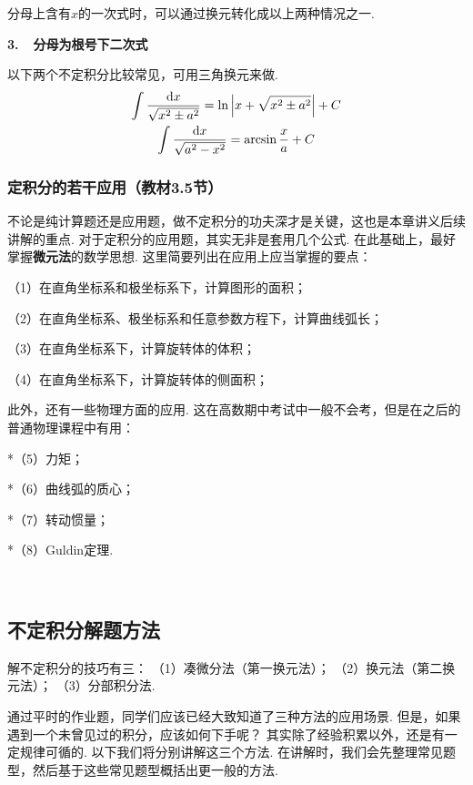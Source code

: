 分母上含有$x$的一次式时，可以通过换元转化成以上两种情况之一.\vspace{0.5em}

\textbf{3.~~分母为根号下二次式}\vspace{0.25em}

以下两个不定积分比较常见，可用三角换元来做.
\begin{gather*}
    \int \frac{\mathrm{d} x}{\sqrt{x^2 \pm a^2}} = \ln \left| x + \sqrt{x^2 \pm a^2}  \right|+C \\
    \int \frac{\mathrm{d} x}{\sqrt{a^2 - x^2}} = \arcsin \frac{x}{a} +C
    \nonumber
\end{gather*}

\subsubsection{定积分的若干应用（教材3.5节）}

不论是纯计算题还是应用题，做不定积分的功夫深才是关键，这也是本章讲义后续讲解的重点.
对于定积分的应用题，其实无非是套用几个公式. 在此基础上，最好掌握\textbf{微元法}的数学思想.
这里简要列出在应用上应当掌握的要点：\par
（1）在直角坐标系和极坐标系下，计算图形的面积；\par
（2）在直角坐标系、极坐标系和任意参数方程下，计算曲线弧长；\par
（3）在直角坐标系下，计算旋转体的体积；\par
（4）在直角坐标系下，计算旋转体的侧面积；\vspace{0.5em}

此外，还有一些物理方面的应用. 这在高数期中考试中一般不会考，但是在之后的普通物理课程中有用：\par
*（5）力矩；\par
*（6）曲线弧的质心；\par
*（7）转动惯量；\par
*（8）Guldin定理.\par
~\par

\subsection{不定积分解题方法}
解不定积分的技巧有三：
（1）凑微分法（第一换元法）；
（2）换元法（第二换元法）；
（3）分部积分法. \par

通过平时的作业题，同学们应该已经大致知道了三种方法的应用场景.
但是，如果遇到一个未曾见过的积分，应该如何下手呢？
其实除了经验积累以外，还是有一定规律可循的.
以下我们将分别讲解这三个方法.
在讲解时，我们会先整理常见题型，然后基于这些常见题型概括出更一般的方法. \par
